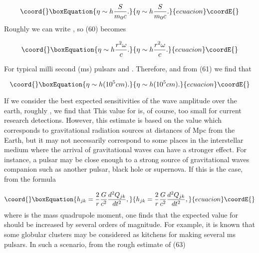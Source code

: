 \documentclass[a4paper,12pt]{article}
\begin{document}
\begin{equation}\coord{}\boxEquation{
\eta \sim h\frac{S}{m_{0}c}.  \label{60}
}{
\eta \sim h\frac{S}{m_{0}c}.  }{ecuacion}\coordE{}\end{equation}
Roughly we can write \coordHE{}, so (60) becomes

\begin{equation}\coord{}\boxEquation{
\eta \sim h\frac{r^{2}\omega }{c}.  \label{61}
}{
\eta \sim h\frac{r^{2}\omega }{c}.  }{ecuacion}\coordE{}\end{equation}

For typical milli second (ms) pulsars \coordHE{} and \coordHE{}. Therefore, \coordHE{} and from (61)
we find that

\begin{equation}\coord{}\boxEquation{
\eta \sim h(10^{5}cm).  \label{62}
}{
\eta \sim h(10^{5}cm).  }{ecuacion}\coordE{}\end{equation}

If we consider the best expected sensitivities of the wave amplitude \coordHE{}
over the earth, roughly \coordHE{}, we find that \coordHE{} This value for \myHighlight{$\eta $}\coordHE{} is, of course, too small for current
research detections. However, this estimate is based on the value \coordHE{} which corresponds to gravitational radiation sources at distances
of Mpc from the Earth, but it may not necessarily correspond to some places
in the interstellar medium where the arrival of gravitational waves can have
a stronger effect. For instance, a pulsar may be close enough to a strong
source of gravitational waves companion such as another pulsar, black hole
or supernova. If this is the case, from the formula

\begin{equation}\coord{}\boxEquation{
h_{jk}=\frac{2}{r}\frac{G}{c^{2}}\frac{d^{2}Q_{jk}}{dt^{2}},  \label{63}
}{
h_{jk}=\frac{2}{r}\frac{G}{c^{2}}\frac{d^{2}Q_{jk}}{dt^{2}},  }{ecuacion}\coordE{}\end{equation}
where \coordHE{} is the mass quadrupole moment, one finds that the expected
value for \coordHE{} should be increased by several orders of magnitude. For
example, it is known that some globular clusters may be considered as
kitchens for making several ms pulsars. In such a scenario, from the rough
estimate of (63)
\end{document}
